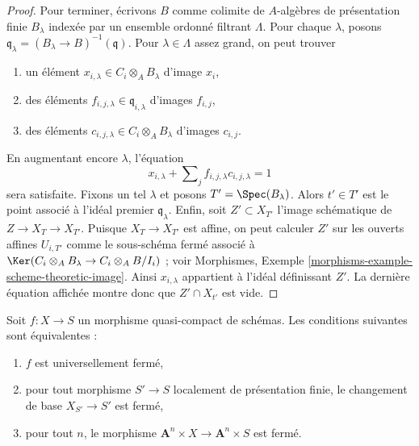 \begin{proof}
\medskip\noindent
Pour terminer, écrivons $B$ comme colimite de
$A$-algèbres de présentation finie $B_\lambda$ indexée par un ensemble ordonné filtrant $\Lambda$.
Pour chaque $\lambda$, posons
$\mathfrak q_\lambda = (B_\lambda \to B)^{-1}(\mathfrak q)$.
Pour $\lambda \in \Lambda$ assez grand, on peut trouver
\begin{enumerate}
\item un élément
$x_{i, \lambda} \in C_i \otimes_A B_\lambda$ d'image $x_i$,
\item des éléments $f_{i, j, \lambda} \in \mathfrak q_{i, \lambda}$
d'images $f_{i, j}$,
\item des éléments $c_{i, j, \lambda} \in C_i \otimes_A B_\lambda$
d'images $c_{i, j}$.
\end{enumerate}
En augmentant encore $\lambda$, l'équation
$$
x_{i, \lambda} + \sum\nolimits_j f_{i, j, \lambda}c_{i, j, \lambda} = 1
$$
sera satisfaite. Fixons un tel $\lambda$ et posons $T' = \Spec(B_\lambda)$.
Alors $t' \in T'$ est le point associé à l'idéal premier $\mathfrak q_\lambda$.
Enfin, soit $Z' \subset X_{T'}$ l'image schématique de
$Z \to X_T \to X_{T'}$. Puisque $X_T \to X_{T'}$ est affine, on peut calculer $Z'$
sur les ouverts affines $U_{i, T'}$ comme le sous-schéma fermé associé
à $\Ker(C_i \otimes_A B_\lambda \to C_i \otimes_A B/I_i)$ ; voir
Morphismes, Exemple \ref{morphisms-example-scheme-theoretic-image}.
Ainsi $x_{i, \lambda}$ appartient à l'idéal définissant $Z'$. La dernière
équation affichée montre donc que $Z' \cap X_{t'}$ est vide.
\end{proof}

\begin{lemma}
\label{lemma-test-universally-closed}
Soit $f : X \to S$ un morphisme quasi-compact de schémas.
Les conditions suivantes sont équivalentes :
\begin{enumerate}
\item $f$ est universellement fermé,
\item pour tout morphisme $S' \to S$ localement de présentation finie,
le changement de base $X_{S'} \to S'$ est fermé,
\item pour tout $n$, le morphisme
$\mathbf{A}^n \times X \to \mathbf{A}^n \times S$
est fermé.
\end{enumerate}
\end{lemma}

